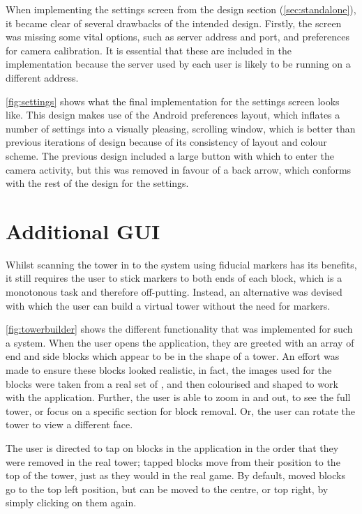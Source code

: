 When implementing the settings screen from the design section (\cref{sec:standalone}), it became clear of several drawbacks of the intended design. Firstly, the screen was missing some vital options, such as server address and port, and preferences for camera calibration. It is essential that these are included in the implementation because the server used by each user is likely to be running on a different address.

\cref{fig:settings} shows what the final implementation for the settings screen looks like. This design makes use of the Android preferences layout, which inflates a number of settings into a visually pleasing, scrolling window, which is better than previous iterations of design because of its consistency of layout and colour scheme. The previous design included a large button with which to enter the camera activity, but this was removed in favour of a back arrow, which conforms with the rest of the design for the settings.

\section{Additional GUI}

Whilst scanning the tower in to the system using fiducial markers has its benefits, it still requires the user to stick markers to both ends of each \jenga{} block, which is a monotonous task and therefore off-putting. Instead, an alternative was devised with which the user can build a virtual tower without the need for markers.

\cref{fig:towerbuilder} shows the different functionality that was implemented for such a system. When the user opens the application, they are greeted with an array of end and side blocks which appear to be in the shape of a tower. An effort was made to ensure these blocks looked realistic, in fact, the images used for the blocks were taken from a real set of \jenga{}, and then colourised and shaped to work with the application. Further, the user is able to zoom in and out, to see the full tower, or focus on a specific section for block removal. Or, the user can rotate the tower to view a different face.

The user is directed to tap on blocks in the application in the order that they were removed in the real tower; tapped blocks move from their position to the top of the tower, just as they would in the real game. By default, moved blocks go to the top left position, but can be moved to the centre, or top right, by simply clicking on them again.

